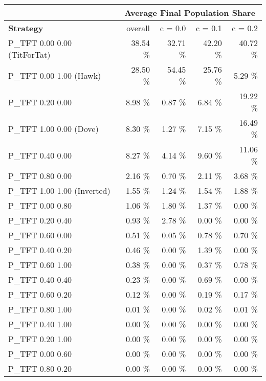 \begin{tabular}{|l|r|r|r|r|}
\hline
 & \multicolumn{4}{c|}{{\bf Average Final Population Share}} \\
\hline
{\bf Strategy} & overall &  c = 0.0 & c = 0.1 & c = 0.2\\ \hline
P\_TFT 0.00 0.00 (TitForTat)  &   38.54 \%  &   32.71 \%  &   42.20 \%  &   40.72 \% \\
P\_TFT 0.00 1.00 (Hawk)       &   28.50 \%  &   54.45 \%  &   25.76 \%  &    5.29 \% \\
P\_TFT 0.20 0.00              &    8.98 \%  &    0.87 \%  &    6.84 \%  &   19.22 \% \\
P\_TFT 1.00 0.00 (Dove)       &    8.30 \%  &    1.27 \%  &    7.15 \%  &   16.49 \% \\
P\_TFT 0.40 0.00              &    8.27 \%  &    4.14 \%  &    9.60 \%  &   11.06 \% \\
P\_TFT 0.80 0.00              &    2.16 \%  &    0.70 \%  &    2.11 \%  &    3.68 \% \\
P\_TFT 1.00 1.00 (Inverted)   &    1.55 \%  &    1.24 \%  &    1.54 \%  &    1.88 \% \\
P\_TFT 0.00 0.80              &    1.06 \%  &    1.80 \%  &    1.37 \%  &    0.00 \% \\
P\_TFT 0.20 0.40              &    0.93 \%  &    2.78 \%  &    0.00 \%  &    0.00 \% \\
P\_TFT 0.60 0.00              &    0.51 \%  &    0.05 \%  &    0.78 \%  &    0.70 \% \\
P\_TFT 0.40 0.20              &    0.46 \%  &    0.00 \%  &    1.39 \%  &    0.00 \% \\
P\_TFT 0.60 1.00              &    0.38 \%  &    0.00 \%  &    0.37 \%  &    0.78 \% \\
P\_TFT 0.40 0.40              &    0.23 \%  &    0.00 \%  &    0.69 \%  &    0.00 \% \\
P\_TFT 0.60 0.20              &    0.12 \%  &    0.00 \%  &    0.19 \%  &    0.17 \% \\
P\_TFT 0.80 1.00              &    0.01 \%  &    0.00 \%  &    0.02 \%  &    0.01 \% \\
P\_TFT 0.40 1.00              &    0.00 \%  &    0.00 \%  &    0.00 \%  &    0.00 \% \\
P\_TFT 0.20 1.00              &    0.00 \%  &    0.00 \%  &    0.00 \%  &    0.00 \% \\
P\_TFT 0.00 0.60              &    0.00 \%  &    0.00 \%  &    0.00 \%  &    0.00 \% \\
P\_TFT 0.80 0.20              &    0.00 \%  &    0.00 \%  &    0.00 \%  &    0.00 \% \\

\end{tabular}
